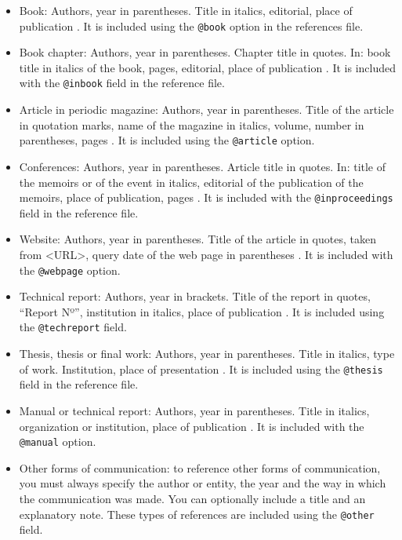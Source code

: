 \documentclass[eng,blind]{ajceam-class}
\begin{document}
\begin{itemize}
 \item Book: Authors, year in parentheses. Title in italics, editorial, place of publication \cite{Alarcos1999}. It is included using the \texttt{@book} option in the references file.
%
 \item Book chapter: Authors, year in parentheses. Chapter title in quotes. In: book title in italics of the book, pages, editorial, place of publication \cite{Mitchell2001}. It is included with the \texttt{@inbook} field in the reference file.
%
 \item Article in periodic magazine: Authors, year in parentheses. Title of the article in quotation marks, name of the magazine in italics, volume, number in parentheses, pages \cite{ArslanHansen1996, WangEtAl2015}. It is included using the \texttt{@article} option.
%
 \item Conferences: Authors, year in parentheses. Article title in quotes. In: title of the memoirs or of the event in italics, editorial of the publication of the memoirs, place of publication, pages \cite{BarkovaJouvet1999}. It is included with the \texttt{@inproceedings} field in the reference file.
%
 \item Website: Authors, year in parentheses. Title of the article in quotes, taken from <URL>, query date of the web page in parentheses \cite{CFDwebpage}. It is included with the \texttt{@webpage} option.
%
 \item Technical report: Authors, year in brackets. Title of the report in quotes, ``Report Nº'', institution in italics, place of publication \cite{NACA460}. It is included using the \texttt{@techreport} field.
%
 \item Thesis, thesis or final work: Authors, year in parentheses. Title in italics, type of work. Institution, place of presentation \cite{Krause2014}. It is included using the \texttt{@thesis} field in the reference file.
%
 \item Manual or technical report: Authors, year in parentheses. Title in italics, organization or institution, place of publication \cite{Indura2010}. It is included with the \texttt{@manual} option.
%
 \item Other forms of communication: to reference other forms of communication, you must always specify the author or entity, the year and the way in which the communication was made. You can optionally include a title and an explanatory note. These types of references are included using the \texttt{@other} field.
\end{itemize}
\end{document}
